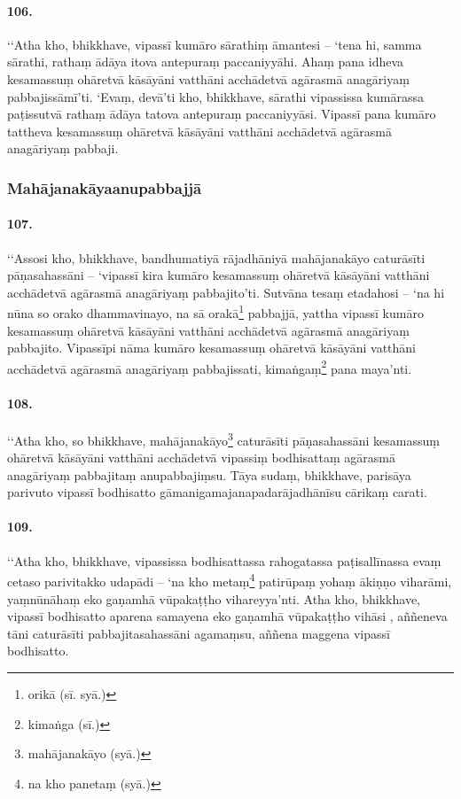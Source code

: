 \paragraph{106.} ‘‘Atha kho, bhikkhave, vipassī kumāro sārathiṃ āmantesi – ‘tena hi, samma sārathi, rathaṃ ādāya itova antepuraṃ paccaniyyāhi. Ahaṃ pana idheva kesamassuṃ ohāretvā kāsāyāni vatthāni acchādetvā agārasmā anagāriyaṃ pabbajissāmī’ti. ‘Evaṃ, devā’ti kho, bhikkhave, sārathi vipassissa kumārassa paṭissutvā rathaṃ ādāya tatova antepuraṃ paccaniyyāsi. Vipassī pana kumāro tattheva kesamassuṃ ohāretvā kāsāyāni vatthāni acchādetvā agārasmā anagāriyaṃ pabbaji.

\subsubsection{Mahājanakāyaanupabbajjā}

\paragraph{107.} ‘‘Assosi kho, bhikkhave, bandhumatiyā rājadhāniyā mahājanakāyo caturāsīti pāṇasahassāni – ‘vipassī kira kumāro kesamassuṃ ohāretvā kāsāyāni vatthāni acchādetvā agārasmā anagāriyaṃ pabbajito’ti. Sutvāna tesaṃ etadahosi – ‘na hi nūna so orako dhammavinayo, na sā orakā\footnote{orikā (sī. syā.)} pabbajjā, yattha vipassī kumāro kesamassuṃ ohāretvā kāsāyāni vatthāni acchādetvā agārasmā anagāriyaṃ pabbajito. Vipassīpi nāma kumāro kesamassuṃ ohāretvā kāsāyāni vatthāni acchādetvā agārasmā anagāriyaṃ pabbajissati, kimaṅgaṃ\footnote{kimaṅga (sī.)} pana maya’nti.

\paragraph{108.} ‘‘Atha kho, so bhikkhave, mahājanakāyo\footnote{mahājanakāyo (syā.)} caturāsīti pāṇasahassāni kesamassuṃ ohāretvā kāsāyāni vatthāni acchādetvā vipassiṃ bodhisattaṃ agārasmā anagāriyaṃ pabbajitaṃ anupabbajiṃsu. Tāya sudaṃ, bhikkhave, parisāya parivuto vipassī bodhisatto gāmanigamajanapadarājadhānīsu cārikaṃ carati.

\paragraph{109.} ‘‘Atha kho, bhikkhave, vipassissa bodhisattassa rahogatassa paṭisallīnassa evaṃ cetaso parivitakko udapādi – ‘na kho metaṃ\footnote{na kho panetaṃ (syā.)} patirūpaṃ yohaṃ ākiṇṇo viharāmi, yaṃnūnāhaṃ eko gaṇamhā vūpakaṭṭho vihareyya’nti. Atha kho, bhikkhave, vipassī bodhisatto aparena samayena eko gaṇamhā vūpakaṭṭho vihāsi , aññeneva tāni caturāsīti pabbajitasahassāni agamaṃsu, aññena maggena vipassī bodhisatto.

